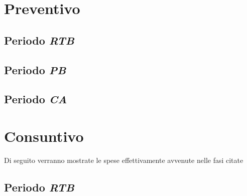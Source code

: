 \documentclass[5pt]{article}
\begin{document}
\section{Preventivo}
\subsection{Periodo \textit{RTB}}
\subsection{Periodo \textit{PB}}
\subsection{Periodo \textit{CA}}

\section{Consuntivo}
Di seguito verranno mostrate le spese effettivamente avvenute nelle fasi citate
\subsection{Periodo \textit{RTB}}
\end{document}
